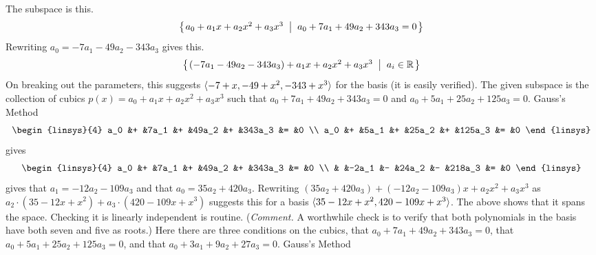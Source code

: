 \begin{Answer}
        \Question The subspace is this.
          \begin{equation*}
             \mbox{$\left\{\hspace{0.1em}a_0+a_1x+a_2x^2+a_3x^3 \;\;\middle|\;\; a_0+7a_1+49a_2+343a_3=0 \hspace{0.1em}\right\}$}
          \end{equation*}
          Rewriting $a_0=-7a_1-49a_2-343a_3$ gives this.
          \begin{equation*}
             \mbox{$\left\{\hspace{0.1em}(-7a_1-49a_2-343a_3)+a_1x+a_2x^2+a_3x^3 
               \;\;\middle|\;\; a_i\in\mathbb{R} \hspace{0.1em}\right\}$}
          \end{equation*}
          On breaking out the
          parameters, this suggests \( \langle-7+x,-49+x^2,-343+x^3\rangle \)  
          for the basis (it is easily verified).
        \Question The given subspace is the collection of cubics
          $p(x)=a_0+a_1x+a_2x^2+a_3x^3$ such that $a_0+7a_1+49a_2+343a_3=0$
          and $a_0+5a_1+25a_2+125a_3=0$.     
          Gauss's Method 
          \begin{equation*}
            \begin{linsys}{4}
              a_0  &+  &7a_1  &+  &49a_2  &+  &343a_3  &=  &0  \\
              a_0  &+  &5a_1  &+  &25a_2  &+  &125a_3  &=  &0    
            \end{linsys}
        \end{equation*}
	gives
	\begin{equation*}    
	\begin{linsys}{4}
              a_0  &+  &7a_1  &+  &49a_2  &+  &343a_3  &=  &0  \\
                   &   &-2a_1 &-  &24a_2  &-  &218a_3  &=  &0    
            \end{linsys}
          \end{equation*}
          gives that $a_1=-12a_2-109a_3$ and that $a_0=35a_2+420a_3$.
          Rewriting $(35a_2+420a_3)+(-12a_2-109a_3)x+a_2x^2+a_3x^3$
          as $a_2\cdot(35-12x+x^2)+a_3\cdot(420-109x+x^3)$
          suggests this for a basis  $\langle35-12x+x^2,420-109x+x^3\rangle$.
          The above shows that it spans the space.
          Checking it is linearly independent is routine.
          (\textit{Comment.} 
          A worthwhile check is to verify that both polynomials in the
          basis have both seven and five as roots.)
        \Question Here there are three conditions on the cubics,
          that $a_0+7a_1+49a_2+343a_3=0$, that $a_0+5a_1+25a_2+125a_3=0$,
          and that $a_0+3a_1+9a_2+27a_3=0$.
          Gauss's Method 
          \begin{equation*}

\end{equation*}
\end{Answer}
